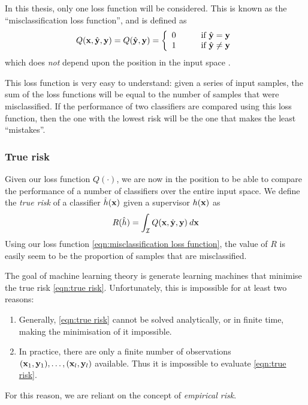 In this thesis, only one loss function will be considered.  This is
known as the ``misclassification loss function'', and is defined as
%
\begin{equation}
Q(\mathbf{x}, \hat{\mathbf{y}}, \mathbf{y}) = Q(\hat{\mathbf{y}}, \mathbf{y}) = \left\{
\begin{array}{ll}
	0	&	\qquad \mbox{if $\hat{\mathbf{y}} = \mathbf{y}$} \\
	1	&	\qquad \mbox{if $\hat{\mathbf{y}} \neq \mathbf{y}$}
\end{array}
\right.
\label{eqn:misclassification loss function}
\end{equation}
%
which does \emph{not} depend upon the position in the input space \bfx.

This loss function is very easy to understand: given a series of input
samples, the sum of the loss functions will be equal to the number of
samples that were misclassified.  If the performance of two
classifiers are compared using this loss function, then the one with
the lowest risk will be the one that makes the least ``mistakes''.


\subsubsection{True risk}
Given our loss function $Q(\cdot)$, we are now in the position to be
able to compare the performance of a number of classifiers over the
entire input space.  We define the \emph{true risk} of a classifier
$\hat{h}(\mathbf{x})$ given a supervisor $h(\mathbf{x})$ as
%
\begin{equation}
R(\hat{h}) = \int_{\mathcal{I}} Q(\mathbf{x}, \hat{\mathbf{y}}, \mathbf{y}) \: d\mathbf{x}
\label{eqn:true risk}
\end{equation}
%
Using our loss function \ref{eqn:misclassification loss function}, the
value of $R$ is easily seem to be the proportion of samples that are
misclassified.

The goal of machine learning theory is generate learning
machines that minimise the true risk \ref{eqn:true risk}.
Unfortunately, this is impossible for at least two reasons:
%
\begin{enumerate}
\item	Generally, \ref{eqn:true risk} cannot be solved analytically,
	or in finite time, making the minimisation of it impossible.
%
\item	In practice, there are only a finite number of observations
	$(\mathbf{x}_1, \mathbf{y}_1), \ldots, (\mathbf{x}_l, \mathbf{y}_l)$ available.  Thus
	it is impossible to evaluate \ref{eqn:true risk}.
\end{enumerate}
%
For this reason, we are reliant on the concept of \emph{empirical
risk}.

